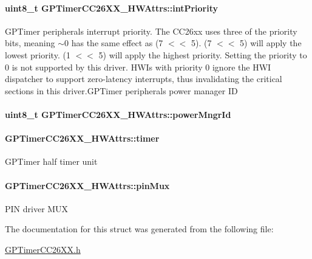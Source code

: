 \paragraph[{int\+Priority}]{\setlength{\rightskip}{0pt plus 5cm}uint8\+\_\+t G\+P\+Timer\+C\+C26\+X\+X\+\_\+\+H\+W\+Attrs\+::int\+Priority}\label{struct_g_p_timer_c_c26_x_x___h_w_attrs_a83fbce47b4ff591bde69b5f77d2c133e}
G\+P\+Timer peripheral\textquotesingle{}s interrupt priority. The C\+C26xx uses three of the priority bits, meaning $\sim$0 has the same effect as (7 $<$$<$ 5). (7 $<$$<$ 5) will apply the lowest priority. (1 $<$$<$ 5) will apply the highest priority. Setting the priority to 0 is not supported by this driver. H\+W\+I\textquotesingle{}s with priority 0 ignore the H\+W\+I dispatcher to support zero-\/latency interrupts, thus invalidating the critical sections in this driver.\+G\+P\+Timer peripheral\textquotesingle{}s power manager I\+D 
\paragraph[{power\+Mngr\+Id}]{\setlength{\rightskip}{0pt plus 5cm}uint8\+\_\+t G\+P\+Timer\+C\+C26\+X\+X\+\_\+\+H\+W\+Attrs\+::power\+Mngr\+Id}\label{struct_g_p_timer_c_c26_x_x___h_w_attrs_a3772ec5a7f529047ed690c83cffad038}
\paragraph[{timer}]{ G\+P\+Timer\+C\+C26\+X\+X\+\_\+\+H\+W\+Attrs\+::timer}\label{struct_g_p_timer_c_c26_x_x___h_w_attrs_a85c14724ff57d1b25d6552752293d7fc}
G\+P\+Timer half timer unit 
\paragraph[{pin\+Mux}]{ G\+P\+Timer\+C\+C26\+X\+X\+\_\+\+H\+W\+Attrs\+::pin\+Mux}\label{struct_g_p_timer_c_c26_x_x___h_w_attrs_a7a5f3ba89a0094ead820cc15f9465ed5}
P\+I\+N driver M\+U\+X 

The documentation for this struct was generated from the following file\+:\begin{DoxyCompactItemize}
\item 
\hyperlink{_g_p_timer_c_c26_x_x_8h}{G\+P\+Timer\+C\+C26\+X\+X.\+h}\end{DoxyCompactItemize}
